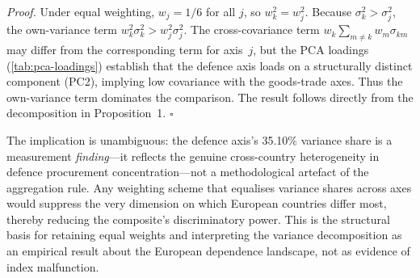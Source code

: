 \noindent\textit{Proof.}  Under equal weighting, $w_j = 1/6$ for
all $j$, so $w_k^2 = w_j^2$.  Because $\sigma_k^2 > \sigma_j^2$,
the own-variance term $w_k^2\sigma_k^2 > w_j^2\sigma_j^2$.  The
cross-covariance term $w_k\sum_{m\neq k}w_m\sigma_{km}$ may differ
from the corresponding term for axis~$j$, but the PCA loadings
(\cref{tab:pca-loadings}) establish that the defence axis loads on
a structurally distinct component (PC2), implying low covariance
with the goods-trade axes.  Thus the own-variance term dominates
the comparison.  The result follows directly from the decomposition
in Proposition~1.
\hfill$\square$

The implication is unambiguous: the defence axis's 35.10\% variance
share is a measurement \emph{finding}---it reflects the genuine
cross-country heterogeneity in defence procurement
concentration---not a methodological artefact of the aggregation
rule.  Any weighting scheme that equalises variance shares across
axes would suppress the very dimension on which European countries
differ most, thereby reducing the composite's discriminatory power.
This is the structural basis for retaining equal weights and
interpreting the variance decomposition as an empirical result about
the European dependence landscape, not as evidence of index
malfunction.
